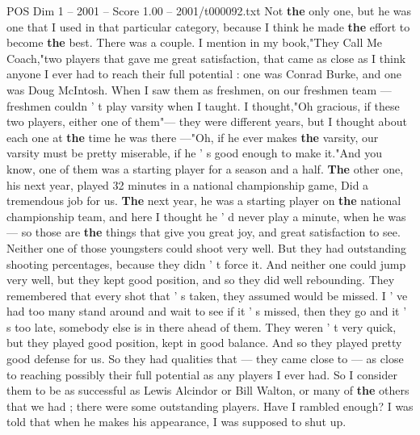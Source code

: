 \begin{textsample}{POS Dim 1 – 2001 – Score 1.00 – 2001/t000092.txt}
Not \textbf{the} only one, but he was one that I used in that particular category, because I think he made \textbf{the} effort to become \textbf{the} best.
There was a couple.
I mention in my book,"They Call Me Coach,"two players that gave me great satisfaction, that came as close as I think anyone I ever had to reach their full potential : one was Conrad Burke, and one was Doug McIntosh.
When I saw them as freshmen, on our freshmen team — freshmen couldn ' t play varsity when I taught.
I thought,"Oh gracious, if these two players, either one of them"— they were different years, but I thought about each one at \textbf{the} time he was there —"Oh, if he ever makes \textbf{the} varsity, our varsity must be pretty miserable, if he ' s good enough to make it."And you know, one of them was a starting player for a season and a half. \textbf{The} other one, his next year, played 32 minutes in a national championship game, Did a tremendous job for us. \textbf{The} next year, he was a starting player on \textbf{the} national championship team, and here I thought he ' d never play a minute, when he was — so those are \textbf{the} things that give you great joy, and great satisfaction to see.
Neither one of those youngsters could shoot very well.
But they had outstanding shooting percentages, because they didn ' t force it.
And neither one could jump very well, but they kept good position, and so they did well rebounding.
They remembered that every shot that ' s taken, they assumed would be missed.
I ' ve had too many stand around and wait to see if it ' s missed, then they go and it ' s too late, somebody else is in there ahead of them.
They weren ' t very quick, but they played good position, kept in good balance.
And so they played pretty good defense for us.
So they had qualities that — they came close to — as close to reaching possibly their full potential as any players I ever had.
So I consider them to be as successful as Lewis Alcindor or Bill Walton, or many of \textbf{the} others that we had ; there were some outstanding players.
Have I rambled enough?
I was told that when he makes his appearance, I was supposed to shut up.

\end{textsample}
